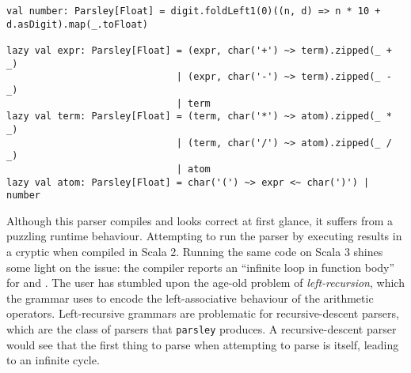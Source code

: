 \documentclass[../../main.tex]{subfiles}
\begin{document}
\begin{verbatim}
val number: Parsley[Float] = digit.foldLeft1(0)((n, d) => n * 10 + d.asDigit).map(_.toFloat)

lazy val expr: Parsley[Float] = (expr, char('+') ~> term).zipped(_ + _)
                              | (expr, char('-') ~> term).zipped(_ - _)
                              | term
lazy val term: Parsley[Float] = (term, char('*') ~> atom).zipped(_ * _)
                              | (term, char('/') ~> atom).zipped(_ / _)
                              | atom
lazy val atom: Parsley[Float] = char('(') ~> expr <~ char(')') | number
\end{verbatim}
%
Although this parser compiles and looks correct at first glance, it suffers from a puzzling runtime behaviour.
Attempting to run the parser by executing  results in a cryptic  when compiled in Scala 2.
Running the same code on Scala 3 shines some light on the issue: the compiler reports an ``infinite loop in function body'' for  and .
The user has stumbled upon the age-old problem of \emph{left-recursion}, which the grammar uses to encode the left-associative behaviour of the arithmetic operators.
Left-recursive grammars are problematic for recursive-descent parsers, which are the class of parsers that \texttt{parsley} produces.
A recursive-descent parser would see that the first thing to parse when attempting to parse  is  itself, leading to an infinite cycle.
\end{document}

